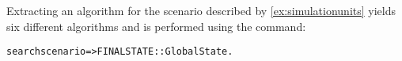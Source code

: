 \begin{example}
  Extracting an algorithm for the scenario described by \cref{ex:simulationunits} yields six different algorithms and is performed using the command:

  \small
  \begin{alltt}
    search scenario => FINALSTATE::GlobalState .
  \end{alltt}
  \normalsize





\end{example}
